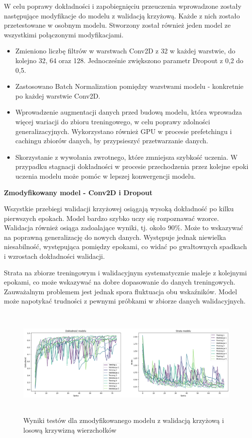 W celu poprawy dokładności i zapobiegnięciu przeuczenia wprowadzone
zostały następujące modyfikacje do modelu z walidacją krzyżową.
Każde z nich zostało przetestowane w osobnym modelu.
Stworzony został również jeden model ze wszystkimi połączonymi modyfikacjami. 
\begin{itemize}[label=-,labelsep=0.4cm,leftmargin=0.6cm]
    \item Zmieniono liczbę filtrów w warstwach Conv2D z 32 w każdej warstwie, do kolejno 32, 64 oraz 128.
		Jednocześnie zwiększono parametr Dropout z 0,2 do 0,5.
    \item Zastosowano Batch Normalization pomiędzy warstwami modelu - konkretnie po każdej warstwie Conv2D.
    \item Wprowadzenie augmentacji danych przed budową modelu, która wprowadza więcej wariacji do zbioru treningowego,
		w celu poprawy zdolności generalizacyjnych.
		Wykorzystano również GPU w procesie prefetchingu i cachingu zbiorów danych, by przypsieszyć przetwarzanie danych.
	\item Skorzystanie z wywołania zwrotnego, które zmniejsza szybkość uczenia.
		W przypadku stagnacji dokładności w procesie przechodzenia przez kolejne epoki uczenia modelu
		może pomóc w lepszej konwergencji modelu.
\end{itemize}

\textbf{Zmodyfikowany model - Conv2D i Dropout}

Wszystkie przebiegi walidacji krzyżowej osiągają wysoką dokładność po kilku pierwszych epokach.
Model bardzo szybko uczy się rozpoznawać wzorce.
Walidacja również osiąga zadoalające wyniki, tj. około 90\%. Może to wskazywać na poprawną generalizację do nowych danych.
Występuje jednak niewielka niesabilność, występująca pomiędzy epokami,
co widać po gwałtownych spadkach i wzrostach dokładności walidacji.

Strata na zbiorze treningowym i walidacyjnym systematycznie maleje z kolejnymi epokami,
co może wskazywać na dobre dopasowanie do danych treningowych.
Zauważalnym problemem jest jednak spora fluktuacja obu wskaźników.
Model może napotykać trudności z pewnymi próbkami w zbiorze danych walidacyjnych. 

\begin{figure}[ht]
	\centering
	\includegraphics[height=5.5cm]{resources/tests/images/v4/crossvalid_1_img.png}
	\caption{Wyniki testów dla zmodyfikowanego modelu z walidacją krzyżową i losową krzywizną wierzchołków}
	\label{Fig:tests-cv-1}
\end{figure}
\FloatBarrier

